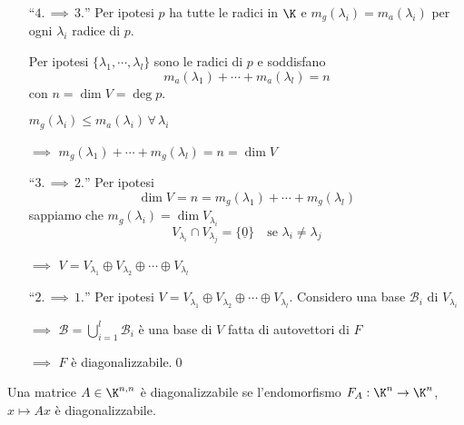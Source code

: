 {\begin{itemize}
        $\implies$ $ m_{g}(\lambda_1)=k_1  $

        $ \{v_{k_1+1}, \cdots, v_{k_1+k_2}\}  $ è una basee di $ V_{\lambda_1}  $ 
        
        $\implies$ $ \dim V_{\lambda_2} =k_2 $ 
        
        $\implies$ $ m_{g}(\lambda_2)=k_2 $

        Si itera il processo per ogni $ \lambda_{i}  $. 
        
        $\implies$ $ m_{a}(\lambda_{i} )= m_{g}(\lambda_{i} )   $ $ \forall\, i =1, \cdots, l $
        \item [``$4. \,\implies\,3.$''] Per ipotesi $ p $ ha tutte le radici in $ \K $ e $ m_{g}(\lambda_i)=m_{a}(\lambda_i)$ per ogni $ \lambda_{i}  $ radice di $ p $.
        
        Per ipotesi $ \{\lambda_1, \cdots, \lambda_{l} \} $ sono le radici di $ p $ e soddisfano \[m_{a}(\lambda_1)+\cdots+m_{a}(\lambda_{l} ) =n  \] con $ n= \dim V=\deg p $.

        $ m_{g}(\lambda_i)\le m_{a}(\lambda_i) \, \forall\, \lambda_i  $ 
        
        $\implies$ $ m_{g}(\lambda_1)+\cdots+ m_{g}(\lambda_{l} )=n=\dim V   $
        \item [``$3. \,\implies\,2.$''] Per ipotesi \[\dim V=n= m_{g}(\lambda_1)+\cdots+ m_{g}(\lambda_{l} )\] sappiamo che $ m_{g}(\lambda_{i})= \dim V_{\lambda_{i} }   $ \[
            V_{\lambda_{i} }\cap V_{\lambda_{j} }=\{\underline{0}\}\quad\text{se } \lambda_{i}\neq \lambda_j      
        \] 
        
        $\implies$ $ V=V_{\lambda_1}\oplus V_{\lambda_2}\oplus \cdots\oplus V_{\lambda_{l} }     $
        \item [``$2. \,\implies\,1.$''] Per ipotesi $ V=V_{\lambda_1}\oplus V_{\lambda_2}\oplus \cdots\oplus V_{\lambda_{l} } $. Considero una base $ \mathscr{B}_i $ di $ V_{\lambda_{i} }$ 
        
        $\implies$ $ \displaystyle\mathscr{B}=\bigcup_{i=1}^{l} \mathscr{B}_i  $ è una base di $ V $ fatta di autovettori di $ F $ 
        
        $\implies$ $ F $ è diagonalizzabile.\qed
    \end{itemize}
}


Una matrice $ A \in \K^{n,n}$ è diagonalizzabile se l'endomorfismo $ F_{A}: \K^{n}\to \K^{n}  $, $ x \mapsto Ax$ è diagonalizzabile.

